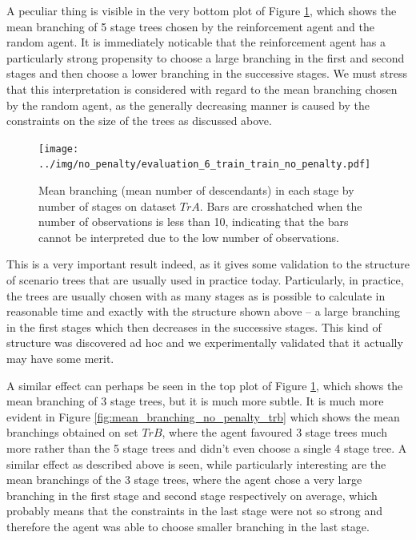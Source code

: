 A peculiar thing is visible in the very bottom plot of Figure \ref{fig:mean_branching_no_penalty_tra}, which shows the mean branching of 5 stage trees chosen by the reinforcement agent and the random agent. It is immediately noticable that the reinforcement agent has a particularly strong propensity to choose a large branching in the first and second stages and then choose a lower branching in the successive stages. We must stress that this interpretation is considered with regard to the mean branching chosen by the random agent, as the generally decreasing manner is caused by the constraints on the size of the trees as discussed above. 


\begin{figure}[H]
\centering
  \texttt{[image: ../img/no\_penalty/evaluation\_6\_train\_train\_no\_penalty.pdf]}
  \caption{Mean branching (mean number of descendants) in each stage by number of stages on dataset $TrA$. Bars are crosshatched when the number of observations is less than 10, indicating that the bars cannot be interpreted due to the low number of observations.}
  \label{fig:mean_branching_no_penalty_tra}
\end{figure}

This is a very important result indeed, as it gives some validation to the structure of scenario trees that are usually used in practice today. Particularly, in practice, the trees are usually chosen with as many stages as is possible to calculate in reasonable time and exactly with the structure shown above -- a large branching in the first stages which then decreases in the successive stages. This kind of structure was discovered ad hoc and we experimentally validated that it actually may have some merit.

A similar effect can perhaps be seen in the top plot of Figure \ref{fig:mean_branching_no_penalty_tra}, which shows the mean branching of 3 stage trees, but it is much more subtle. It is much more evident in Figure \ref{fig:mean_branching_no_penalty_trb} which shows the mean branchings obtained on set $TrB$, where the agent favoured 3 stage trees much more rather than the 5 stage trees and didn't even choose a single 4 stage tree. A similar effect as described above is seen, while particularly interesting are the mean branchings of the 3 stage trees, where the agent chose a very large branching in the first stage and second stage respectively on average, which probably means that the constraints in the last stage were not so strong and therefore the agent was able to choose smaller branching in the last stage.


